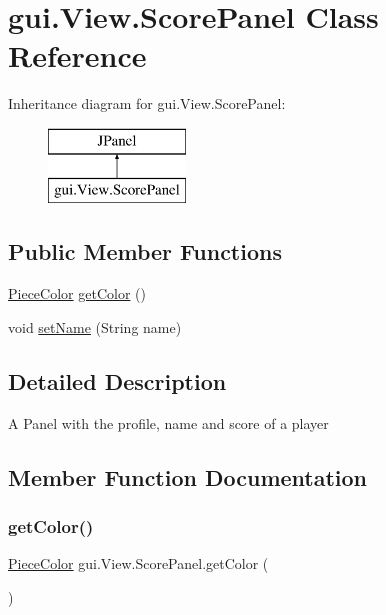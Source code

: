 \hypertarget{classgui_1_1_view_1_1_score_panel}{}\section{gui.\+View.\+Score\+Panel Class Reference}
\label{classgui_1_1_view_1_1_score_panel}
Inheritance diagram for gui.\+View.\+Score\+Panel\+:\begin{figure}[H]
\begin{center}
\leavevmode
\includegraphics[height=2.000000cm]{classgui_1_1_view_1_1_score_panel}
\end{center}
\end{figure}
\subsection*{Public Member Functions}
\begin{DoxyCompactItemize}
\item 
\mbox{\hyperlink{enumpieces_1_1_piece_1_1_piece_color}{Piece\+Color}} \mbox{\hyperlink{classgui_1_1_view_1_1_score_panel_a162bd408d798b9d65253147b83d9feae}{get\+Color}} ()
\item 
void \mbox{\hyperlink{classgui_1_1_view_1_1_score_panel_a3dd245187918d98e62c6059980528cd7}{set\+Name}} (String name)
\end{DoxyCompactItemize}


\subsection{Detailed Description}
A Panel with the profile, name and score of a player 

\subsection{Member Function Documentation}
\mbox{\label{classgui_1_1_view_1_1_score_panel_a162bd408d798b9d65253147b83d9feae}} 
\subsubsection{\texorpdfstring{get\+Color()}{getColor()}}
{\footnotesize\ttfamily \mbox{\hyperlink{enumpieces_1_1_piece_1_1_piece_color}{Piece\+Color}} gui.\+View.\+Score\+Panel.\+get\+Color (\begin{DoxyParamCaption}{ }\end{DoxyParamCaption})}

